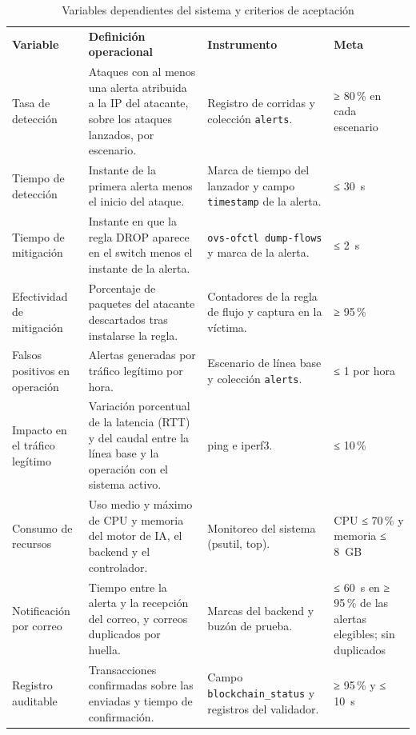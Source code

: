 \begin{table}[H]
\centering
\footnotesize
\renewcommand{\arraystretch}{1.15}
\setlength{\tabcolsep}{3.5pt}
\caption{{\fontsize{11pt}{13}\selectfont Variables dependientes del sistema y criterios de aceptación}}
\label{tbl:varSistema}
\begin{tabular}{@{}L{2.9cm}L{5.2cm}L{3.9cm}L{2.9cm}@{}}
\textbf{Variable} & \textbf{Definición operacional} & \textbf{Instrumento} & \textbf{Meta} \\
Tasa de detección & Ataques con al menos una alerta atribuida a la IP del atacante, sobre los ataques lanzados, por escenario. & Registro de corridas y colección \texttt{alerts}. & ≥ 80\,\% en cada escenario \\
Tiempo de detección & Instante de la primera alerta menos el inicio del ataque. & Marca de tiempo del lanzador y campo \texttt{timestamp} de la alerta. & ≤ 30~s \\
Tiempo de mitigación & Instante en que la regla DROP aparece en el switch menos el instante de la alerta. & \texttt{ovs-ofctl dump-flows} y marca de la alerta. & ≤ 2~s \\
Efectividad de mitigación & Porcentaje de paquetes del atacante descartados tras instalarse la regla. & Contadores de la regla de flujo y captura en la víctima. & ≥ 95\,\% \\
Falsos positivos en operación & Alertas generadas por tráfico legítimo por hora. & Escenario de línea base y colección \texttt{alerts}. & ≤ 1 por hora \\
Impacto en el tráfico legítimo & Variación porcentual de la latencia (RTT) y del caudal entre la línea base y la operación con el sistema activo. & ping e iperf3. & ≤ 10\,\% \\
Consumo de recursos & Uso medio y máximo de CPU y memoria del motor de IA, el backend y el controlador. & Monitoreo del sistema (psutil, top). & CPU ≤ 70\,\% y memoria ≤ 8~GB \\
Notificación por correo & Tiempo entre la alerta y la recepción del correo, y correos duplicados por huella. & Marcas del backend y buzón de prueba. & ≤ 60~s en ≥ 95\,\% de las alertas elegibles; sin duplicados \\
Registro auditable & Transacciones confirmadas sobre las enviadas y tiempo de confirmación. & Campo \texttt{blockchain\_status} y registros del validador. & ≥ 95\,\% y ≤ 10~s \\
\end{tabular}
\end{table}

